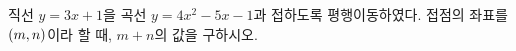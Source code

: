직선 $y=3x+1$을 곡선 $y=4x^2-5x-1$과 접하도록 평행이동하였다. 접점의 좌표를 $(m{,}\mkern3mu\mathopen{}n)$이라 할 때, $m+n$의 값을 구하시오.
